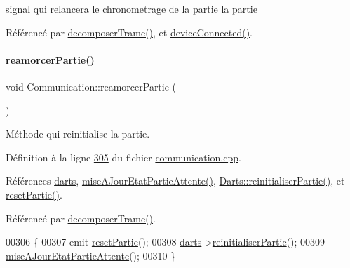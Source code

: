 signal qui relancera le chronometrage de la partie la partie 



Référencé par \hyperlink{communication_8cpp_source_l00188}{decomposer\+Trame()}, et \hyperlink{communication_8cpp_source_l00329}{device\+Connected()}.

\mbox{\label{class_communication_a56ed5d11756b1f9efcca609b9f8a59c9}} 
\paragraph{\texorpdfstring{reamorcer\+Partie()}{reamorcerPartie()}}
{\footnotesize\ttfamily void Communication\+::reamorcer\+Partie (\begin{DoxyParamCaption}{ }\end{DoxyParamCaption})\hspace{0.3cm}{\ttfamily [private]}}



Méthode qui reinitialise la partie. 



Définition à la ligne \hyperlink{communication_8cpp_source_l00305}{305} du fichier \hyperlink{communication_8cpp_source}{communication.\+cpp}.



Références \hyperlink{communication_8h_source_l00093}{darts}, \hyperlink{communication_8cpp_source_l00382}{mise\+A\+Jour\+Etat\+Partie\+Attente()}, \hyperlink{darts_8cpp_source_l00184}{Darts\+::reinitialiser\+Partie()}, et \hyperlink{class_communication_af79d126304cca4281db4624b1b457ade}{reset\+Partie()}.



Référencé par \hyperlink{communication_8cpp_source_l00188}{decomposer\+Trame()}.


\begin{DoxyCode}
00306 \{
00307     emit \hyperlink{class_communication_af79d126304cca4281db4624b1b457ade}{resetPartie}();
00308     \hyperlink{class_communication_a494d609c206472041468e362d7cfc0e5}{darts}->\hyperlink{class_darts_a70c68ed8bd56b63df203c25e6ed14f3b}{reinitialiserPartie}();
00309     \hyperlink{class_communication_a72557be8ab858096e03f08e78e036aeb}{miseAJourEtatPartieAttente}();
00310 \}
\end{DoxyCode}
\mbox{\label{class_communication_af79d126304cca4281db4624b1b457ade}} 
